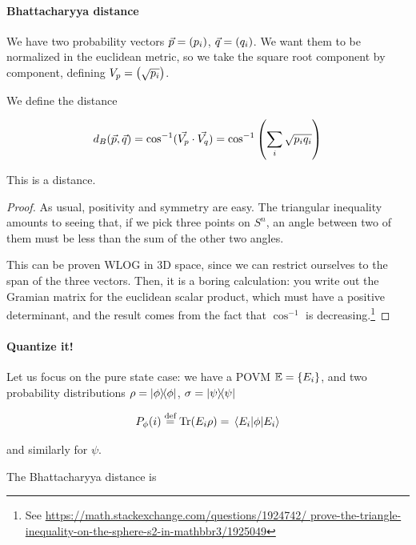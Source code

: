 \documentclass[main.tex]{subfiles}
\begin{document}
\paragraph{Bhattacharyya distance}

We have two probability vectors \(\vec{p} = \qty(p_i)\), \(\vec{q} = \qty(q_i)\).
We want them to be normalized in the euclidean metric, so we take the square root component by component, defining \(V_p = \qty(\sqrt{p_i})\).

We define the distance

\begin{equation}
  d_B (\vec{p}, \vec{q}) = \cos^{-1} (\vec{V_p} \cdot \vec{V_q})
  = \cos^{-1} \qty(\sum_i \sqrt{p_i q_i})
\end{equation}

\begin{claim}
    This is a distance.
\end{claim}

\begin{proof}
    As usual, positivity and symmetry are easy. The triangular inequality amounts to seeing that, if we pick three points on \(S^n\), an angle between two of them must be less than the sum of the other two angles.

    This can be proven WLOG in 3D space, since we can restrict ourselves to the span of the three vectors. Then, it is a boring calculation: you write out the Gramian matrix for the euclidean scalar product, which must have a positive determinant, and the result comes from the fact that \(\cos^{-1}\) is decreasing.\footnote{See \url{https://math.stackexchange.com/questions/1924742/
    prove-the-triangle-inequality-on-the-sphere-s2-in-mathbbr3/1925049}}
\end{proof}

\paragraph{Quantize it!}

Let us focus on the pure state case:
we have a POVM \(\mathbb{E} = \qty{E_i}\), and two probability distributions \(\rho = \ketbra{\phi}\), \(\sigma = \ketbra{\psi}\)

\begin{equation}
  P_\phi (i) \defeq \Tr (E_i \rho) = \ev{\phi}{E_i}
\end{equation}

and similarly for \(\psi\).

The Bhattacharyya distance is
\end{document}
